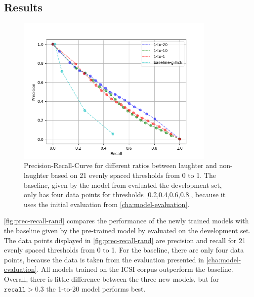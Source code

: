 \documentclass[bsc,frontabs,parskip,deptreport]{infthesis}
\begin{document}
\subsection{Results} \label{sec:exp1-res}

\begin{figure}[h!]
    \centering
    \includegraphics[width = 3.8in]{imgs/prec-recall/exp1-random/dev_compare_class_balance_dev_set.png}
    \caption{Precision-Recall-Curve for different ratios between laughter and non-laughter based on 21 evenly spaced thresholds from 0 to 1.  The baseline, given by the model from \citet{gillick2021robust} evaluated the development set, only has four data points for thresholds [0.2,0.4,0.6,0.8], because it uses the initial evaluation from \autoref{cha:model-evaluation}.}
    \label{fig:prec-recall-rand}
\end{figure}

\autoref{fig:prec-recall-rand} compares the performance of the newly trained models with the baseline given by the pre-trained model by \citet{gillick2021robust} evaluated on the development set.
The data points displayed in \autoref{fig:prec-recall-rand} are precision and recall for 21 evenly spaced thresholds from 0 to 1. For the baseline, there are only four data points, because the data is taken from the evaluation presented in \autoref{cha:model-evaluation}.
All models trained on the ICSI corpus outperform the baseline.
Overall, there is little difference between the three new models, but for $\mathtt{recall} > 0.3$ the 1-to-20 model performs best. 
\end{document}
